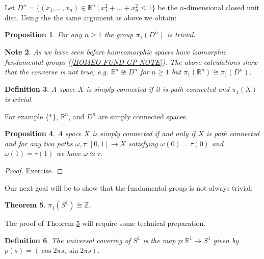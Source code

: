 \documentclass[11pt, letterpaper, oneside]{report}
\theoremstyle{pplain}
\newtheorem{theorem}{Theorem}[chapter]
\newtheorem{proposition}[theorem]{Proposition}
\theoremstyle{ddefinition}
\newtheorem{definition}[theorem]{Definition}
\newtheorem{note}[theorem]{Note}
\theoremstyle{nnn}
\theoremstyle{eexercise}
\newcommand{\Z}{{\mathbb Z}}
\newcommand{\R}{{\mathbb R}}
\begin{document}
Let $D^{n} = \{ (x_{1}, \dots, x_{n})\in \R^{n} \ | \ x_{1}^{2} + \dots + x_{n}^{2} \leq 1  \}$ be 
the $n$-dimensional closed unit disc. Using the the same argument as above we obtain:

\begin{proposition}
\label{PI1 DN TRIVIAL PROP}
For any $n\geq 1$ the group $\pi_{1}(D^{n})$ is trivial. 
\end{proposition}


\begin{note}
As we have seen before homeomorphic spaces have isomorphic fundamental groups 
(\ref{HOMEO FUND GP NOTE}). The above calculations show that the converse is not 
true, e.g. $\R^{n}\ncong D^{n}$ for $n \geq 1$ but $\pi_{1}(\R^{n})\cong \pi_{1}(D^{n})$. 
\end{note}

\begin{definition}
A space $X$ is \emph{simply connected} if it is path connected and $\pi_{1}(X)$ is trivial. 
\end{definition}

For example $\{\ast\}$, $\R^{n}$, and $D^{n}$ are simply connected spaces. 

\begin{proposition}
\label{SIMPLY CONN PROP}
A space $X$ is simply connected if and only if
$X$ is path connected and for any two paths $\omega, \tau\colon [0, 1] \to X$ satisfying 
$\omega(0) = \tau(0)$ and $\omega(1) = \tau(1)$ we have $\omega\simeq\tau$. 
\end{proposition}

\begin{proof}
Exercise. 
\end{proof}

Our next goal will be to show that the fundamental group is not always trivial:

\begin{theorem}
\label{S1 FUND GP THM}
$\pi_{1}(S^{1})\cong \Z$. 
\end{theorem}


The proof of Theorem \ref{S1 FUND GP THM} will require some technical preparation. 

\begin{definition}
\label{S1 UNIVERSAL COVER DEF}
The \emph{universal covering} of $S^{1}$ is the map $p\colon \R^{1}\to S^{1}$ given by 
$p(s) = (\cos 2\pi s, \sin 2\pi s)$.  
\end{definition}
\end{document}
